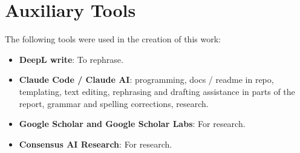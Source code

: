 \section{Auxiliary Tools}
\label{sec:auxiliary_tools}

The following tools were used in the creation of this work:

\begin{itemize}
    \item \textbf{DeepL write}: To rephrase.
    \item \textbf{Claude Code / Claude AI}: programming, docs / readme in repo, templating, text editing, rephrasing and drafting assistance in parts of the report, grammar and spelling corrections, research.
    \item \textbf{Google Scholar and Google Scholar Labs}: For research.
    \item \textbf{Consensus AI Research}: For research.
\end{itemize}